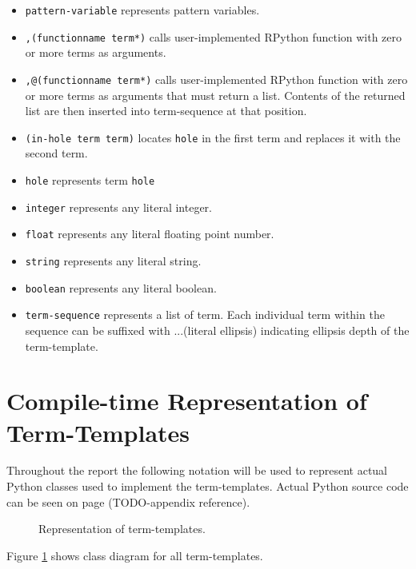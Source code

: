 \begin{itemize}
\item 
\texttt{pattern-variable} represents pattern variables.
\item
\texttt{,(functionname term*)} calls user-implemented RPython function with zero or more terms as arguments.
\item
\texttt{,@(functionname term*)} calls user-implemented RPython function with zero or more terms as arguments that must return a list. Contents of the returned list are then inserted into term-sequence at that position. 
\item
\texttt{(in-hole term term)} locates \lstinline{hole} in the first term and replaces it with the second term.
\item
\texttt{hole} represents term \lstinline{hole}
\item
\texttt{integer} represents any literal integer.
\item
\texttt{float} represents any literal floating point number.
\item
\texttt{string}  represents any literal string.
\item
\texttt{boolean}  represents any literal boolean.
\item
\texttt{term-sequence} represents a list of term.  Each individual term within the sequence can be suffixed with ...(literal ellipsis) indicating ellipsis depth of the term-template.
\end{itemize}

\section{Compile-time Representation of Term-Templates}

Throughout the report the following notation will be used to represent actual Python classes used to implement the term-templates. Actual Python source code can be seen on page (TODO-appendix reference). 

\begin{figure}[H]
	\centering
	\caption{Representation of term-templates.}
\label{class-diagram-termtemplate}
\end{figure}

Figure \ref{class-diagram-termtemplate} shows class diagram for all term-templates.


